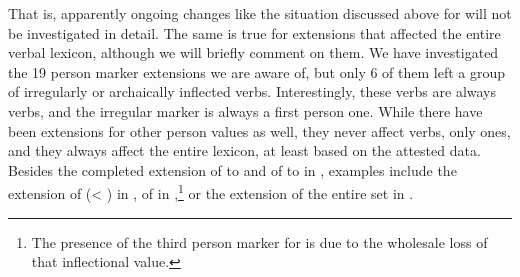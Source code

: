 That is, apparently ongoing changes like the situation discussed above for \kaxui will not be investigated in detail.
The same is true for extensions that affected the entire verbal lexicon, although we will briefly comment on them.
We have investigated the 19 person marker extensions we are aware of, but only 6 of them left a group of irregularly or archaically inflected verbs.
Interestingly, these verbs are always  verbs, and the irregular marker is always a first person one.
While there have been extensions for other person values as well, they never affect  verbs, only  ones, and they always affect the entire lexicon, at least based on the attested data.
Besides the completed extension of  to  and of  to  in \PWai {}, examples include the extension of   (< ) in \apalai {}, of   in \panare {},\footnote{The presence of the third person marker  for  is due to the wholesale loss of that inflectional value.} or the extension of the entire  set in \waimiri {}.

